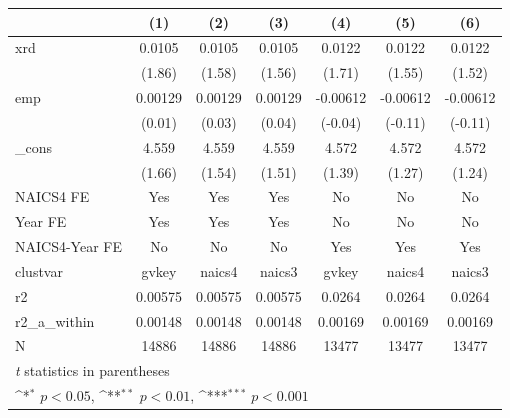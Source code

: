 {
\def\sym#1{\ifmmode^{#1}\else\(^{#1}\)\fi}
\begin{tabular}{l*{6}{c}}
\hline\hline
            &\multicolumn{1}{c}{(1)}         &\multicolumn{1}{c}{(2)}         &\multicolumn{1}{c}{(3)}         &\multicolumn{1}{c}{(4)}         &\multicolumn{1}{c}{(5)}         &\multicolumn{1}{c}{(6)}         \\
\hline
xrd         &      0.0105         &      0.0105         &      0.0105         &      0.0122         &      0.0122         &      0.0122         \\
            &      (1.86)         &      (1.58)         &      (1.56)         &      (1.71)         &      (1.55)         &      (1.52)         \\
[1em]
emp         &     0.00129         &     0.00129         &     0.00129         &    -0.00612         &    -0.00612         &    -0.00612         \\
            &      (0.01)         &      (0.03)         &      (0.04)         &     (-0.04)         &     (-0.11)         &     (-0.11)         \\
[1em]
\_cons      &       4.559         &       4.559         &       4.559         &       4.572         &       4.572         &       4.572         \\
            &      (1.66)         &      (1.54)         &      (1.51)         &      (1.39)         &      (1.27)         &      (1.24)         \\
[1em]
NAICS4 FE   &         Yes         &         Yes         &         Yes         &          No         &          No         &          No         \\
[1em]
Year FE     &         Yes         &         Yes         &         Yes         &          No         &          No         &          No         \\
[1em]
NAICS4-Year FE&          No         &          No         &          No         &         Yes         &         Yes         &         Yes         \\
\hline
clustvar    &       gvkey         &      naics4         &      naics3         &       gvkey         &      naics4         &      naics3         \\
r2          &     0.00575         &     0.00575         &     0.00575         &      0.0264         &      0.0264         &      0.0264         \\
r2\_a\_within &     0.00148         &     0.00148         &     0.00148         &     0.00169         &     0.00169         &     0.00169         \\
N           &       14886         &       14886         &       14886         &       13477         &       13477         &       13477         \\
\hline\hline
\multicolumn{7}{l}{\footnotesize \textit{t} statistics in parentheses}\\
\multicolumn{7}{l}{\footnotesize \sym{*} \(p<0.05\), \sym{**} \(p<0.01\), \sym{***} \(p<0.001\)}\\
\end{tabular}
}

